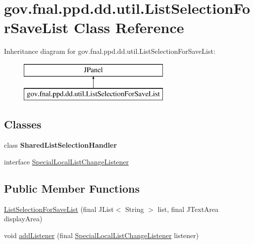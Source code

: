 \hypertarget{classgov_1_1fnal_1_1ppd_1_1dd_1_1util_1_1ListSelectionForSaveList}{\section{gov.\-fnal.\-ppd.\-dd.\-util.\-List\-Selection\-For\-Save\-List Class Reference}
\label{classgov_1_1fnal_1_1ppd_1_1dd_1_1util_1_1ListSelectionForSaveList}
}
Inheritance diagram for gov.\-fnal.\-ppd.\-dd.\-util.\-List\-Selection\-For\-Save\-List\-:\begin{figure}[H]
\begin{center}
\leavevmode
\includegraphics[height=2.000000cm]{classgov_1_1fnal_1_1ppd_1_1dd_1_1util_1_1ListSelectionForSaveList}
\end{center}
\end{figure}
\subsection*{Classes}
\begin{DoxyCompactItemize}
\item 
class {\bfseries Shared\-List\-Selection\-Handler}
\item 
interface \hyperlink{interfacegov_1_1fnal_1_1ppd_1_1dd_1_1util_1_1ListSelectionForSaveList_1_1SpecialLocalListChangeListener}{Special\-Local\-List\-Change\-Listener}
\end{DoxyCompactItemize}
\subsection*{Public Member Functions}
\begin{DoxyCompactItemize}
\item 
\hyperlink{classgov_1_1fnal_1_1ppd_1_1dd_1_1util_1_1ListSelectionForSaveList_ae0a6c2f010b2295a1f92a91dc5231d57}{List\-Selection\-For\-Save\-List} (final J\-List$<$ String $>$ list, final J\-Text\-Area display\-Area)
\item 
void \hyperlink{classgov_1_1fnal_1_1ppd_1_1dd_1_1util_1_1ListSelectionForSaveList_ad917427d17e3b310f3b7b27c1e106b3e}{add\-Listener} (final \hyperlink{interfacegov_1_1fnal_1_1ppd_1_1dd_1_1util_1_1ListSelectionForSaveList_1_1SpecialLocalListChangeListener}{Special\-Local\-List\-Change\-Listener} listener)
\end{DoxyCompactItemize}


